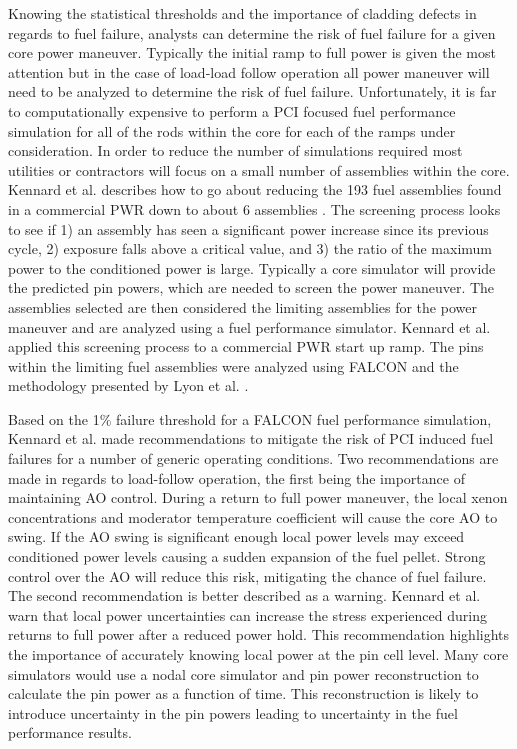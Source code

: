 \documentclass[edeposit,fullpage,11pt]{uiucthesis2009}
\begin{document}
Knowing the statistical thresholds and the importance of cladding defects in regards to fuel failure, analysts can determine the risk of fuel failure for a given core power maneuver.
Typically the initial ramp to full power is given the most attention but in the case of load-load follow operation all power maneuver will need to be analyzed to determine the risk of fuel failure.
Unfortunately, it is far to computationally expensive to perform a \gls{PCI} focused fuel performance simulation for all of the rods within the core for each of the ramps under consideration.
In order to reduce the number of simulations required most utilities or contractors will focus on a small number of assemblies within the core.
Kennard et al. describes how to go about reducing the 193 fuel assemblies found in a commercial \gls{PWR} down to about 6 assemblies \cite{kennard_pci_2016}.
The screening process  looks to see if 1) an assembly has seen a significant power increase since its previous cycle, 2) exposure falls above a critical value, and 3) the ratio of the maximum power to the conditioned power is large.
Typically a core simulator will provide the predicted pin powers, which are needed to screen the power maneuver.
The assemblies selected are then considered the limiting assemblies for the power maneuver and are analyzed using a fuel performance simulator.
Kennard et al. applied this screening process to a commercial \gls{PWR} start up ramp.
The pins within the limiting fuel assemblies were analyzed using FALCON and the methodology presented by Lyon et al. \cite{lyon_pci_2009}.

Based on the 1\% failure threshold for a FALCON fuel performance simulation, Kennard et al. made recommendations to mitigate the risk of \gls{PCI} induced fuel failures for a number of generic operating conditions.
Two recommendations are made in regards to load-follow operation, the first being the importance of maintaining \gls{AO} control.
During a return to full power maneuver, the local xenon concentrations and moderator temperature coefficient will cause the core \gls{AO} to swing.
If the \gls{AO} swing is significant enough local power levels may exceed conditioned power levels causing a sudden expansion of the fuel pellet.
Strong control over the \gls{AO} will reduce this risk, mitigating the chance of fuel failure.
The second recommendation is better described as a warning.
Kennard et al. warn that local power uncertainties can increase the stress experienced during returns to full power after a reduced power hold.
This recommendation highlights the importance of accurately knowing local power at the pin cell level.
Many core simulators would use a nodal core simulator and pin power reconstruction to calculate the pin power as a function of time.
This reconstruction is likely to introduce uncertainty in the pin powers leading to uncertainty in the fuel performance results.
\end{document}
